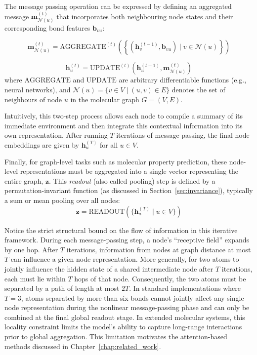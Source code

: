 The message passing operation can be expressed by defining an aggregated message $\mathbf{m}_{\mathcal{N}(u)}^{(t)}$ that incorporates both neighbouring node states and their corresponding bond features $\mathbf{b}_{vu}$:

\begin{equation}
\label{eq:mpnn-aggregate}
    \mathbf{m}_{\mathcal{N}(u)}^{(t)} = \text{AGGREGATE}^{(t)} \left( \left\{ \left( \mathbf{h}_v^{(t-1)}, \mathbf{b}_{vu} \right) \mid v \in \mathcal{N}(u) \right\} \right)
\end{equation}

\begin{equation}
\label{eq:mpnn-update}
    \mathbf{h}_u^{(t)} = \text{UPDATE}^{(t)} \left( \mathbf{h}_u^{(t-1)}, \mathbf{m}_{\mathcal{N}(u)}^{(t)} \right)
\end{equation}
where $\text{AGGREGATE}$ and $\text{UPDATE}$ are arbitrary differentiable functions 
(e.g., neural networks), and $\mathcal{N}(u) = \{ v \in V \mid (u,v) \in E \}$ denotes the set of neighbours of node $u$ in the molecular graph $G = (V,E)$.

Intuitively, this two-step process allows each node to compile a summary of its immediate environment and then integrate this contextual information into its own representation. After running $T$ iterations of message passing, the final node embeddings are given by $\mathbf{h}_u^{(T)}$ for all $u \in V$.

Finally, for graph-level tasks such as molecular property prediction, these node-level representations must be aggregated into a single vector representing the entire graph, $\mathbf{z}$. This \textit{readout} (also called pooling) step is defined by a permutation-invariant function (as discussed in Section~\ref{sec:invariance}), typically a sum or mean pooling over all nodes:
\begin{equation}
\label{eq:mpnn-readout}
    \mathbf{z} = \text{READOUT} \left( \{ \mathbf{h}_u^{(T)} \mid u \in V \} \right)
\end{equation}

Notice the strict structural bound on the flow of information in this iterative framework. During each message-passing step, a node's ``receptive field'' expands by one hop.
After $T$ iterations, information from nodes at graph distance at most $T$ can influence a given node representation. More generally, for two atoms to jointly influence the hidden state of a shared intermediate node after $T$ iterations, each must lie within $T$ hops of that node. Consequently, the two atoms must be separated by a path of length at most $2T$. In standard implementations where $T=3$, atoms separated by more than six bonds cannot jointly affect any single node representation during the nonlinear message-passing phase and can only be combined at the final global readout stage. In extended molecular systems, this locality constraint limits the model's ability to capture long-range interactions prior to global aggregation. This limitation motivates the attention-based methods discussed in Chapter~\ref{chap:related_work}.

